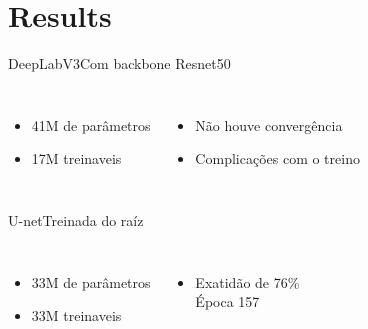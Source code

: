 \section{Results}


\begin{frame}[c]{DeepLabV3}{Com backbone Resnet50}

    \begin{columns}
            \begin{itemize}
                  \item 41M de parâmetros
                  \item 17M treinaveis
            \end{itemize}
            \begin{itemize}
                  \item Não houve convergência
                  \item Complicações com o treino
            \end{itemize}
    \end{columns}

    
  \end{frame}


\begin{frame}[c]{U-net}{Treinada do raíz}

  \begin{columns}

      \begin{itemize}
            \item 33M de parâmetros
            \item 33M treinaveis
      \end{itemize}

    \begin{itemize}
      \item Exatidão de 76\% \\Época 157
    \end{itemize}


  \end{columns}

\end{frame}

\newcommand{\plotA}{\inserttrainvalplot{resources/data/train_info_unet_200_smooth.csv}{ylabel=Loss, xmin=0, xmax=157, ymin=0, ymax=2, title=U-Net from scratch - Smoothed losses}{Train losses}{Validation losses}{north east}}
\newcommand{\plotB}{\inserttrainvalplot{resources/data/train_info_unet_200_smooth.csv}{ylabel=DICE Score, xmin=0, xmax=157, ymin=0, ymax=1, title=U-Net from scratch - Smoothed DICE scores}{Train DICE}{Validation DICE}{north west}}


